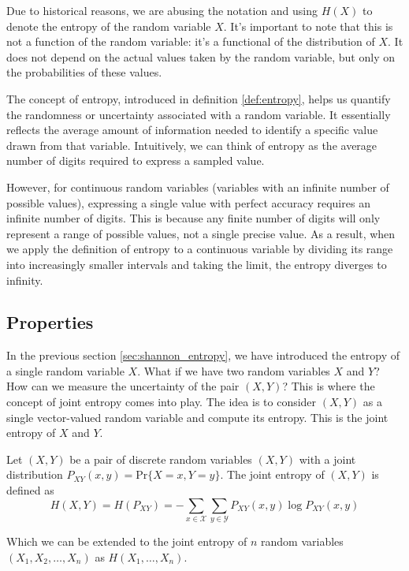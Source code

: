 \begin{remark}
    Due to historical reasons, we are abusing the notation and using $H(X)$ to denote the entropy of the random variable $X$. It's important to note that this is not a function of the random variable: it's a functional of the distribution of $X$. It does not depend on the actual values taken by the random variable, but only on the probabilities of these values.
\end{remark}
The concept of entropy, introduced in definition \ref{def:entropy}, helps us quantify the randomness or uncertainty associated with a random variable. It essentially reflects the average amount of information needed to identify a specific value drawn from that variable. Intuitively, we can think of entropy as the average number of digits required to express a sampled value.

However, for continuous random variables (variables with an infinite number of possible values), expressing a single value with perfect accuracy requires an infinite number of digits. This is because any finite number of digits will only represent a range of possible values, not a single precise value. As a result, when we apply the definition of entropy to a continuous variable by dividing its range into increasingly smaller intervals and taking the limit, the entropy diverges to infinity.


\subsection{Properties}
In the previous section \ref{sec:shannon_entropy}, we have introduced the entropy of a single random variable $X$. What if we have two random variables $X$ and $Y$? How can we measure the uncertainty of the pair $(X,Y)$? This is where the concept of joint entropy comes into play. The idea is to consider $(X,Y)$ as a single vector-valued random variable and compute its entropy. This is the joint entropy of $X$ and $Y$.

\begin{definition}\label{def:joint_entropy}
    Let $(X,Y)$ be a pair of discrete random variables $(X,Y)$ with a joint distribution $P_{XY}(x,y) = \text{Pr}\{X=x,Y=y\}$. The joint entropy of $(X,Y)$ is defined as
    \begin{equation}\label{eq:joint_entropy}
        H(X,Y) = H(P_{XY}) = -\sum_{x\in\mathcal{X}}\sum_{y\in\mathcal{Y}} P_{XY}(x,y)\log P_{XY}(x,y)
    \end{equation}
\end{definition}
\noindent Which we can be extended to the joint entropy of $n$ random variables $(X_1,X_2,\ldots,X_n)$ as $H(X_1,\ldots, X_n)$. \vspace*{0.4cm}

